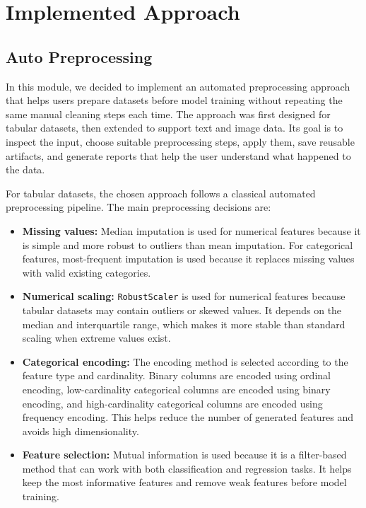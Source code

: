 \documentclass[12pt,a4paper]{report}
\begin{document}
\section{Implemented Approach}

\subsection{Auto Preprocessing}
In this module, we decided to implement an automated preprocessing approach that
helps users prepare datasets before model training without repeating the same
manual cleaning steps each time. The approach was first designed for tabular
datasets, then extended to support text and image data. Its goal is to inspect
the input, choose suitable preprocessing steps, apply them, save reusable
artifacts, and generate reports that help the user understand what happened to
the data.

\noindent For tabular datasets, the chosen approach follows a classical automated
preprocessing pipeline. The main preprocessing decisions are:

\begin{itemize}
  \item \textbf{Missing values:} Median imputation is used for numerical
  features because it is simple and more robust to outliers than mean
  imputation. For categorical features, most-frequent imputation is used because
  it replaces missing values with valid existing categories.

  \item \textbf{Numerical scaling:} \texttt{RobustScaler} is used for numerical
  features because tabular datasets may contain outliers or skewed values. It
  depends on the median and interquartile range, which makes it more stable than
  standard scaling when extreme values exist.

  \item \textbf{Categorical encoding:} The encoding method is selected according
  to the feature type and cardinality. Binary columns are encoded using ordinal
  encoding, low-cardinality categorical columns are encoded using binary
  encoding, and high-cardinality categorical columns are encoded using frequency
  encoding. This helps reduce the number of generated features and avoids high
  dimensionality.

  \item \textbf{Feature selection:} Mutual information is used because it is a
  filter-based method that can work with both classification and regression
  tasks. It helps keep the most informative features and remove weak features
  before model training.
\end{itemize}
\end{document}
